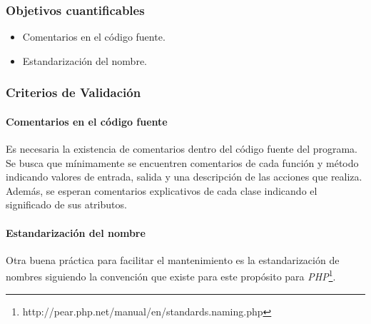 \subsubsection{Objetivos cuantificables}

\begin{itemize}
	\item
	Comentarios en el código fuente.
	\item
	Estandarización del nombre.

\end{itemize}

\subsubsection{Criterios de Validación}

\paragraph{Comentarios en el código fuente\\}

Es necesaria la existencia de comentarios dentro del código fuente del programa. Se busca que mínimamente se encuentren comentarios de cada función y método indicando valores de entrada, salida y una descripción de las acciones que realiza. Además, se esperan comentarios explicativos de cada clase indicando el significado de sus atributos. 

\paragraph{Estandarización del nombre\\}

Otra buena práctica para facilitar el mantenimiento es la estandarización de nombres siguiendo la convención que existe para este propósito para \textit{PHP}\footnote{http://pear.php.net/manual/en/standards.naming.php}.
